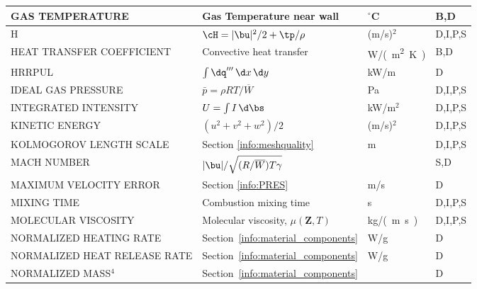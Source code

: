 \documentclass[11pt]{book}
\begin{document}
\begin{longtable}{@{\extracolsep{\fill}}|l|l|l|l|}
{\ct GAS TEMPERATURE}                           & Gas Temperature near wall                         & $^\circ$C      & B,D          \\ \hline
{\ct H}                                         & $\cH=|\bu|^2/2 + \tp/\rho    $                    & (m/s)$^2$      & D,I,P,S      \\ \hline
{\ct HEAT TRANSFER COEFFICIENT}                 & Convective heat transfer                          & \si{W/(m^2.K)} & B,D          \\ \hline
{\ct HRRPUL}                                    & $\int \dq''' \, \d x \, \d y$                     & kW/m           & D            \\ \hline
{\ct IDEAL GAS PRESSURE}                        & $\bar{p}=\rho R T / \overline{W}$                 & Pa             & D,I,P,S      \\ \hline
{\ct INTEGRATED INTENSITY}                      & $U=\int I \, \d \bs$                              & kW/m$^2$       & D,I,P,S      \\ \hline
{\ct KINETIC ENERGY}                            & $(u^2+v^2+w^2)/2$                                 & (m/s)$^2$      & D,I,P,S      \\ \hline
{\ct KOLMOGOROV LENGTH SCALE}                   & Section \ref{info:meshquality}                    & m              & D,I,P,S      \\ \hline
{\ct MACH NUMBER}                               & $|\bu|/\sqrt{(R/\overline{W}) T \gamma}$          &                & S,D          \\ \hline
{\ct MAXIMUM VELOCITY ERROR}                    & Section \ref{info:PRES}                           & m/s            & D            \\ \hline
{\ct MIXING TIME}                               & Combustion mixing time                            & s              & D,I,P,S      \\ \hline
{\ct MOLECULAR VISCOSITY}                       & Molecular viscosity, $\mu(\mathbf{Z},T)$          & \si{kg/(m.s)}  & D,I,P,S      \\ \hline
{\ct NORMALIZED HEATING RATE}                   & Section~\ref{info:material_components}            & W/g            & D            \\ \hline
{\ct NORMALIZED HEAT RELEASE RATE}              & Section~\ref{info:material_components}            & W/g            & D            \\ \hline
{\ct NORMALIZED MASS}$^4$                       & Section~\ref{info:material_components}            &                & D            \\ \hline

\end{longtable}
\end{document}
